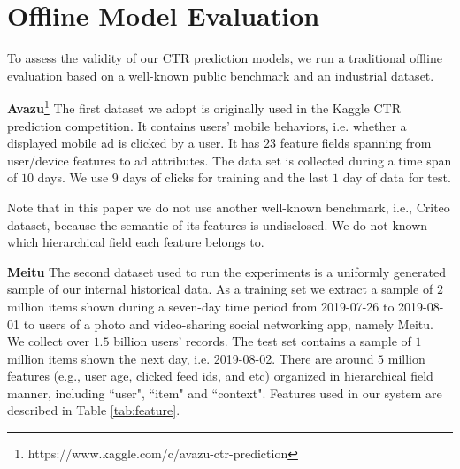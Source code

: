 \documentclass[sigconf]{acmart}
\begin{document}
\section{Offline Model Evaluation}

To assess the validity of our CTR prediction models, we run a traditional offline evaluation based on a well-known public benchmark and an industrial dataset.

\textbf{Avazu}\footnote{https://www.kaggle.com/c/avazu-ctr-prediction} The first dataset we adopt is originally used in the Kaggle CTR prediction competition. It contains users' mobile behaviors, i.e. whether a displayed mobile ad is clicked by a user. It has $23$ feature fields spanning from user/device features to ad attributes. The data set is collected during a time span of $10$ days. We use $9$ days of clicks for training and the last $1$ day of data for test.

Note that in this paper we do not use another well-known benchmark, i.e., Criteo dataset, because the semantic of its features is undisclosed. We do not known which hierarchical field each feature belongs to.

\textbf{Meitu} The second dataset  used to run the experiments is a uniformly generated sample of our internal historical data. As a training set we extract a sample of $2$ million items shown during a seven-day time period from 2019-07-26 to 2019-08-01 to users of a photo and video-sharing social networking app, namely Meitu.  We collect over $1.5$ billion users' records. The test set contains a sample of $1$ million items shown the next day, i.e. 2019-08-02. There are around $5$ million features (e.g., user age, clicked feed ids,  and etc) organized in hierarchical field manner, including ``user", ``item" and ``context".  Features used in our system are described in Table \ref{tab:feature}.
\end{document}
